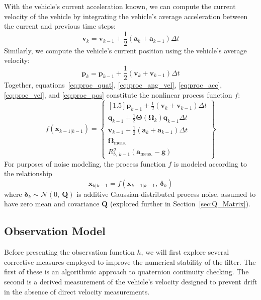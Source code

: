 With the vehicle's current acceleration known, we can compute the current velocity of the vehicle by integrating the vehicle's average acceleration between the current and previous time steps:
%
\begin{equation} \label{eq:proc_vel}
\mathbf{v}_{k} = \mathbf{v}_{k-1} + \frac{1}{2} \left( \mathbf{a}_{k} + \mathbf{a}_{k-1} \right) \Delta t
\end{equation}
%
Similarly, we compute the vehicle's current position using the vehicle's average velocity:
%
\begin{equation} \label{eq:proc_pos}
\mathbf{p}_{k} = \mathbf{p}_{k-1} + \frac{1}{2} \left( \mathbf{v}_{k} + \mathbf{v}_{k-1} \right) \Delta t
\end{equation}
%
Together, equations~\ref{eq:proc_quat}, \ref{eq:proc_ang_vel}, \ref{eq:proc_acc}, \ref{eq:proc_vel}, and \ref{eq:proc_pos} constitute the nonlinear process function $f$:
%
\begin{equation}
f \left( \mathbf{x}_{k-1 | k-1} \right) = 
\begin{Bmatrix}[1.5]
   \mathbf{p}_{k-1} + \frac{1}{2} \left( \mathbf{v}_{k} + \mathbf{v}_{k-1} \right) \Delta t \\
   \mathbf{q}_{k-1} + \frac{1}{2} \mathbf{\Theta} \left( \bm{\Omega}_{k} \right) \mathbf{q}_{k-1} \Delta t \\
   \mathbf{v}_{k-1} + \frac{1}{2} \left( \mathbf{a}_{k} + \mathbf{a}_{k-1} \right) \Delta t \\
   \bm{\Omega}_{\text{meas.}} \\
   R^{g}_{b,\ k-1} \left( \mathbf{a}_{\text{meas.}} - \mathbf{g} \right)
\end{Bmatrix}
\end{equation}
%
For purposes of noise modeling, the process function $f$ is modeled according to the relationship
%
\begin{equation}
\mathbf{x}_{k | k-1} = f \left( \mathbf{x}_{k-1 | k-1},\ \bm{\delta}_{k} \right)
\end{equation}
%
where $\bm{\delta}_{k} \sim \mathcal{N} \left( 0,\ \mathbf{Q} \right)$ is additive Gaussian-distributed process noise, assumed to have zero mean and covariance $\mathbf{Q}$ (explored further in Section~\ref{sec:Q_Matrix}).


\subsection{Observation Model} \label{Observation_Model}

Before presenting the observation function $h$, we will first explore several corrective measures employed to improve the numerical stability of the filter. The first of these is an algorithmic approach to quaternion continuity checking. The second is a derived measurement of the vehicle's velocity designed to prevent drift in the absence of direct velocity measurements.

